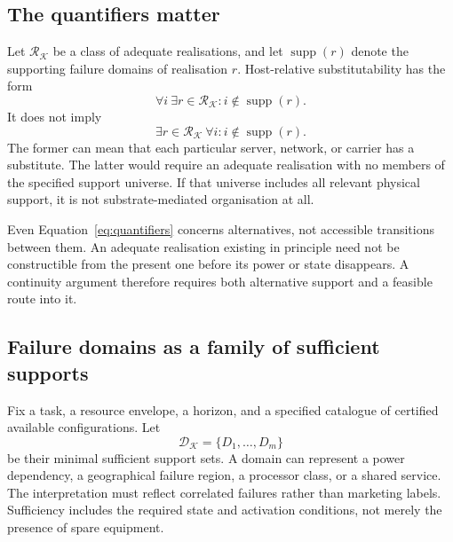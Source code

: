 \documentclass[11pt,a4paper]{article}
\theoremstyle{definition}
\theoremstyle{remark}
\newcommand{\calK}{\mathcal{K}}
\DeclareMathOperator{\supp}{supp}
\begin{document}
\subsection{The quantifiers matter}
Let $\mathscr R_{\calK}$ be a class of adequate realisations, and let $\supp(r)$ denote the supporting failure domains of realisation $r$. Host-relative substitutability has the form
\begin{equation}\label{eq:quantifiers}
 \forall i\ \exists r\in\mathscr R_{\calK}:i\notin\supp(r).
\end{equation}
It does not imply
\[
 \exists r\in\mathscr R_{\calK}\ \forall i:i\notin\supp(r).
\]
The former can mean that each particular server, network, or carrier has a substitute. The latter would require an adequate realisation with no members of the specified support universe. If that universe includes all relevant physical support, it is not substrate-mediated organisation at all.

Even Equation~\eqref{eq:quantifiers} concerns alternatives, not accessible transitions between them. An adequate realisation existing in principle need not be constructible from the present one before its power or state disappears. A continuity argument therefore requires both alternative support and a feasible route into it.

\subsection{Failure domains as a family of sufficient supports}
Fix a task, a resource envelope, a horizon, and a specified catalogue of certified available configurations. Let
\[
 \mathscr D_{\calK}=\{D_1,\ldots,D_m\}
\]
be their minimal sufficient support sets. A domain can represent a power dependency, a geographical failure region, a processor class, or a shared service. The interpretation must reflect correlated failures rather than marketing labels. Sufficiency includes the required state and activation conditions, not merely the presence of spare equipment.
\end{document}
